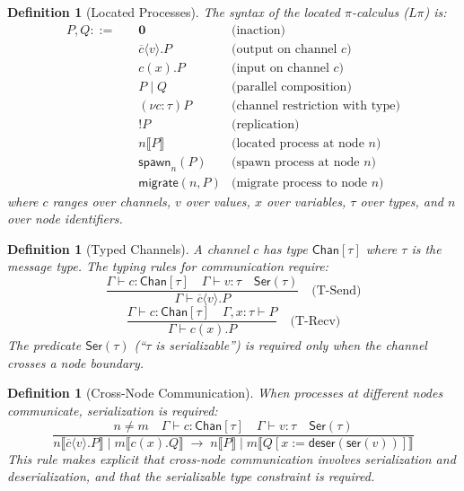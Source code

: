 \documentclass[11pt,a4paper]{article}
\newtheorem{definition}[theorem]{Definition}
\newcommand{\Ser}{\mathsf{Ser}}
\newcommand{\spawn}{\mathsf{spawn}}
\begin{document}
\begin{definition}[Located Processes]
The syntax of the \emph{located $\pi$-calculus} ($L\pi$) is:
\begin{align*}
  P, Q ::= \quad
    & \mathbf{0}                            & \text{(inaction)} \\
    & \overline{c}\langle v \rangle . P     & \text{(output on channel $c$)} \\
    & c(x).P                                & \text{(input on channel $c$)} \\
    & P \mid Q                              & \text{(parallel composition)} \\
    & (\nu c : \tau) P                      & \text{(channel restriction with type)} \\
    & !P                                    & \text{(replication)} \\
    & n \llbracket P \rrbracket             & \text{(located process at node $n$)} \\
    & \spawn_n(P)                           & \text{(spawn process at node $n$)} \\
    & \mathsf{migrate}(n, P)               & \text{(migrate process to node $n$)}
\end{align*}
where $c$ ranges over channels, $v$ over values, $x$ over variables,
$\tau$ over types, and $n$ over node identifiers.
\end{definition}

\begin{definition}[Typed Channels]
A channel $c$ has type $\mathsf{Chan}[\tau]$ where $\tau$ is the message
type. The typing rules for communication require:
\[
\frac{\Gamma \vdash c : \mathsf{Chan}[\tau] \quad \Gamma \vdash v : \tau
      \quad \Ser(\tau)}
     {\Gamma \vdash \overline{c}\langle v \rangle . P}
\quad \text{(T-Send)}
\]
\[
\frac{\Gamma \vdash c : \mathsf{Chan}[\tau] \quad \Gamma, x : \tau \vdash P}
     {\Gamma \vdash c(x).P}
\quad \text{(T-Recv)}
\]
The predicate $\Ser(\tau)$ (``$\tau$ is serializable'') is required only when
the channel crosses a node boundary.
\end{definition}

\begin{definition}[Cross-Node Communication]
When processes at different nodes communicate, serialization is required:
\[
\frac{n \neq m \quad \Gamma \vdash c : \mathsf{Chan}[\tau] \quad
      \Gamma \vdash v : \tau \quad \Ser(\tau)}
     {n\llbracket \overline{c}\langle v \rangle . P \rrbracket \mid
      m\llbracket c(x).Q \rrbracket
      \;\longrightarrow\;
      n\llbracket P \rrbracket \mid
      m\llbracket Q[x := \mathsf{deser}(\mathsf{ser}(v))] \rrbracket}
\]
This rule makes explicit that cross-node communication involves serialization
and deserialization, and that the serializable type constraint is required.
\end{definition}
\end{document}
